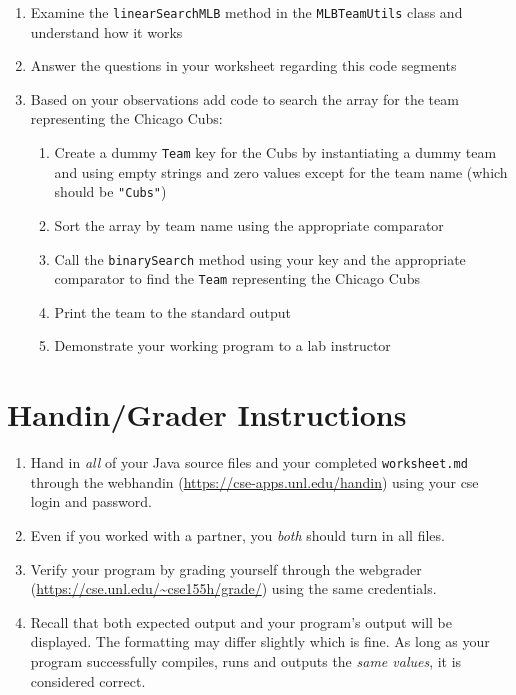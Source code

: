 \documentclass[12pt]{scrartcl}
\begin{document}
\begin{enumerate}
  \item Examine the \texttt{linearSearchMLB} method in the 
  	\texttt{MLBTeamUtils} class and understand how it works
  \item Answer the questions in your worksheet regarding this code segments
  \item Based on your observations add code to search the array for the team 
	representing the Chicago Cubs:
  \begin{enumerate}
    \item Create a dummy \texttt{Team} key for the Cubs by instantiating 
  	a dummy team and using empty strings and zero values except for 
	the team name (which should be \texttt{"Cubs"})
    \item Sort the array by team name using the appropriate comparator
    \item Call the \texttt{binarySearch} method using your key and 
	the appropriate comparator to find the \texttt{Team} representing 
	the Chicago Cubs
    \item Print the team to the standard output
    \item Demonstrate your working program to a lab instructor
  \end{enumerate}
\end{enumerate}

\section{Handin/Grader Instructions}

\begin{enumerate}
  \item Hand in \emph{all} of your Java source files and your
  completed \texttt{worksheet.md}
  through the webhandin (\url{https://cse-apps.unl.edu/handin}) 
  using your cse login and password.  
  \item Even if you worked with a partner, you \emph{both} should
  turn in all files.
  \item Verify your program by grading yourself through the
  webgrader (\url{https://cse.unl.edu/~cse155h/grade/}) using the
  same credentials.
  \item Recall that both expected output and your program's output
  will be displayed.  The formatting may differ slightly which is fine.
  As long as your program successfully compiles, runs and outputs 
  the \emph{same values}, it is considered correct.
\end{enumerate}
\end{document}
